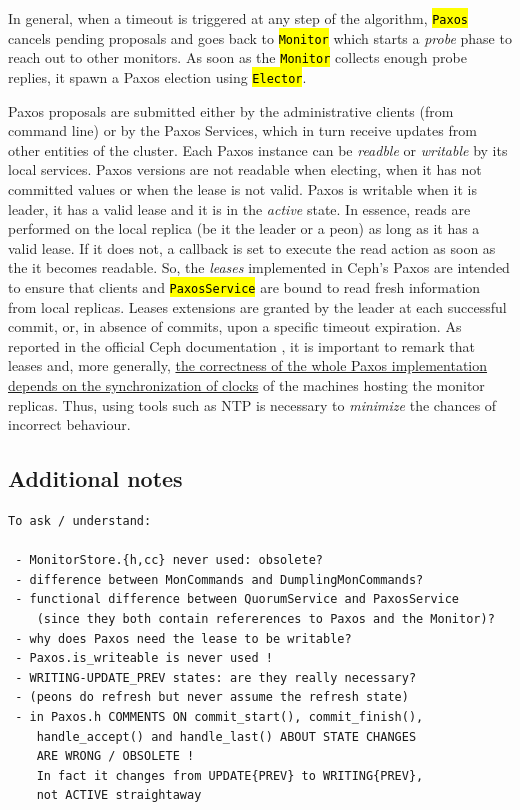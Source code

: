 \documentclass{article}
\newcommand{\hlc}[2][yellow]{\sethlcolor{#1}\hl{#2}}
\renewcommand{\c}[1]{\xspace{\small\hlc[light-gray]{\texttt{#1}}}\xspace}
\begin{document}
In general, when a timeout is triggered at any step of the algorithm, \c{Paxos}
cancels pending proposals and goes back to \c{Monitor} which starts a \textit{probe}
phase to reach out to other monitors.
As soon as the \c{Monitor} collects enough probe replies, it spawn a Paxos election
using \c{Elector}.

Paxos proposals are submitted either by the administrative clients (from command line) 
or by the Paxos Services, which in turn receive updates from other entities of the cluster.
Each Paxos instance can be \textit{readble} or \textit{writable} by its local services.
Paxos versions are not readable when electing, when it has not committed values
or when the lease is not valid.
Paxos is writable when it is leader, it has a valid lease and it is in the \textit{active} state.
In essence, reads are performed on the local replica (be it the leader or a peon) as long as it has a valid lease. 
If it does not, a callback is set to execute the read action as soon as the it becomes readable.
So, the \textit{leases} implemented in Ceph's Paxos are intended to ensure that clients and \c{PaxosService}
are bound to read fresh information from local replicas.
Leases extensions are granted by the leader at each successful commit, or, in absence of commits, 
upon a specific timeout expiration.
As reported in the official Ceph documentation \cite{ceph-mon-clock}, 
it is important to remark that leases and, more generally, 
\uline{the correctness of the whole Paxos implementation 
depends on the synchronization of clocks} of the machines hosting the monitor replicas.
Thus, using tools such as NTP is necessary to \textit{minimize} the chances of incorrect behaviour.

\subsection{Additional notes}

\begin{verbatim}
To ask / understand:
 
 - MonitorStore.{h,cc} never used: obsolete?
 - difference between MonCommands and DumplingMonCommands?
 - functional difference between QuorumService and PaxosService 
    (since they both contain refererences to Paxos and the Monitor)?
 - why does Paxos need the lease to be writable?
 - Paxos.is_writeable is never used !
 - WRITING-UPDATE_PREV states: are they really necessary?
 - (peons do refresh but never assume the refresh state)
 - in Paxos.h COMMENTS ON commit_start(), commit_finish(),
    handle_accept() and handle_last() ABOUT STATE CHANGES 
    ARE WRONG / OBSOLETE !
    In fact it changes from UPDATE{PREV} to WRITING{PREV}, 
    not ACTIVE straightaway
\end{verbatim}
\end{document}
